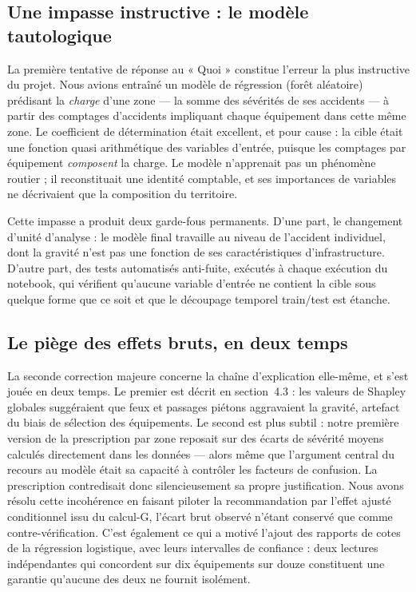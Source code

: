 \subsection{Une impasse instructive : le modèle tautologique}

La première tentative de réponse au « Quoi » constitue l'erreur la plus
instructive du projet. Nous avions entraîné un modèle de régression
(forêt aléatoire) prédisant la \emph{charge} d'une zone — la somme des
sévérités de ses accidents — à partir des comptages d'accidents impliquant
chaque équipement dans cette même zone. Le coefficient de détermination était
excellent, et pour cause : la cible était une fonction quasi arithmétique des
variables d'entrée, puisque les comptages par équipement \emph{composent} la
charge. Le modèle n'apprenait pas un phénomène routier ; il reconstituait une
identité comptable, et ses importances de variables ne décrivaient que la
composition du territoire.

Cette impasse a produit deux garde-fous permanents. D'une part, le changement
d'unité d'analyse : le modèle final travaille au niveau de l'accident
individuel, dont la gravité n'est pas une fonction de ses caractéristiques
d'infrastructure. D'autre part, des tests automatisés anti-fuite, exécutés à
chaque exécution du notebook, qui vérifient qu'aucune variable d'entrée ne
contient la cible sous quelque forme que ce soit et que le découpage temporel
train/test est étanche.

\subsection{Le piège des effets bruts, en deux temps}

La seconde correction majeure concerne la chaîne d'explication elle-même, et
s'est jouée en deux temps. Le premier est décrit en
section~4.3 : les valeurs de Shapley globales suggéraient que feux et
passages piétons aggravaient la gravité, artefact du biais de sélection des
équipements. Le second est plus subtil : notre première version de la
prescription par zone reposait sur des écarts de sévérité moyens calculés
directement dans les données — alors même que l'argument central du recours
au modèle était sa capacité à contrôler les facteurs de confusion. La
prescription contredisait donc silencieusement sa propre justification. Nous
avons résolu cette incohérence en faisant piloter la recommandation par
l'effet ajusté conditionnel issu du calcul-G, l'écart brut observé n'étant
conservé que comme contre-vérification. C'est également ce qui a motivé
l'ajout des rapports de cotes de la régression logistique, avec leurs
intervalles de confiance : deux lectures indépendantes qui concordent sur
dix équipements sur douze constituent une garantie qu'aucune des deux ne
fournit isolément.


